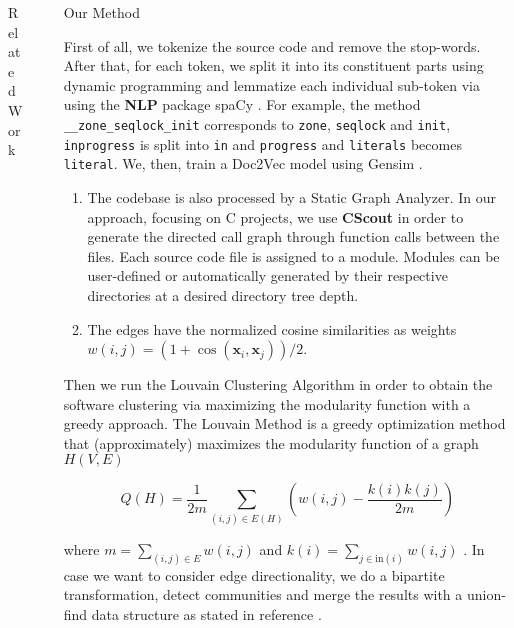 \documentclass[final]{beamer}
\newlength{\sepwidth}
\newlength{\colwidth}
\newcommand{\separatorcolumn}{\begin{column}{\sepwidth}\end{column}}
\begin{document}
\begin{frame}[t]
\begin{columns}[t]
\begin{column}{\colwidth}
\begin{block}{Related Work}
\end{block}



\end{column}

\separatorcolumn

\begin{column}{\colwidth}

\begin{alertblock}{Our Method}

First of all, we tokenize the source code and remove the stop-words. 
After that, for each token, we split it into its constituent parts using dynamic programming \cite{wordninja} and lemmatize 
each individual sub-token via using the \textbf{NLP} package spaCy \cite{spacy}. 
For example, the method \texttt{\_\_zone\_seqlock\_init} corresponds to \texttt{zone}, \texttt{seqlock} and \texttt{init}, 
\texttt{inprogress} is split into \texttt{in} and \texttt{progress} and \texttt{literals} becomes \texttt{literal}.
We, then, train a Doc2Vec model using Gensim \cite{gensim}. 


\begin{enumerate}
\item The codebase is also processed by a Static Graph Analyzer. 
In our approach, focusing on C projects, we use \textbf{CScout} \cite{cscout} in order to generate the directed call graph through function calls between the files. 
Each source code file is assigned to a module. 
Modules can be user-defined or automatically generated by their respective directories at a desired directory tree depth. 

\item The edges have the normalized cosine similarities as weights $w(i,j) = (1 + \cos(\mathbf x_i, \mathbf x_j)) / 2$.
\end{enumerate}


Then we run the Louvain Clustering Algorithm \cite{louvain} in
order to obtain the software clustering via maximizing the modularity function with a greedy approach. 
The Louvain Method is a greedy optimization method that (approximately) maximizes the modularity function of a graph $H(V, E)$

$$Q(H) = \frac {1}{2m} \sum_{(i, j) \in E(H)} \left ( w(i, j) - \frac {k(i) k(j)} {2m} \right )$$
    
where $m = \sum_{(i, j) \in E} w(i,j)$ and $k(i) = \sum_{j \in \mathrm{in}(i)} w(i, j)$ . In case we want to consider edge directionality, we do a bipartite transformation, detect communities and
merge the results with a union-find data structure as stated in reference \cite{malliaros}.


\end{alertblock}
\end{column}
\end{columns}
\end{frame}
\end{document}
